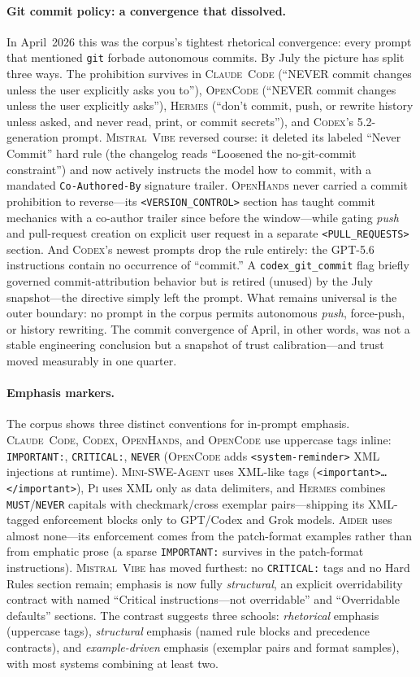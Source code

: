 \documentclass[11pt,a4paper]{article}
\newcommand{\clcode}{\textsc{Claude~Code}\xspace}
\newcommand{\cdx}{\textsc{Codex}\xspace}
\newcommand{\oh}{\textsc{OpenHands}\xspace}
\newcommand{\adr}{\textsc{Aider}\xspace}
\newcommand{\mswe}{\textsc{Mini-SWE-Agent}\xspace}
\newcommand{\vibe}{\textsc{Mistral~Vibe}\xspace}
\newcommand{\hrm}{\textsc{Hermes}\xspace}
\newcommand{\pib}{\textsc{Pi}\xspace}
\newcommand{\ocd}{\textsc{OpenCode}\xspace}
\begin{document}
\paragraph{Git commit policy: a convergence that dissolved.}
In April~2026 this was the corpus's tightest rhetorical convergence: every prompt that mentioned \texttt{git} forbade autonomous commits.
By July the picture has split three ways.
The prohibition survives in \clcode{} (``NEVER commit changes unless the user explicitly asks you to''), \ocd{} (``NEVER commit changes unless the user explicitly asks''), \hrm{} (``don't commit, push, or rewrite history unless asked, and never read, print, or commit secrets''), and \cdx{}'s 5.2-generation prompt.
\vibe{} reversed course: it deleted its labeled ``Never Commit'' hard rule (the changelog reads ``Loosened the no-git-commit constraint'') and now actively instructs the model how to commit, with a mandated \texttt{Co-Authored-By} signature trailer. \oh{} never carried a commit prohibition to reverse---its \texttt{<VERSION\_CONTROL>} section has taught commit mechanics with a co-author trailer since before the window---while gating \emph{push} and pull-request creation on explicit user request in a separate \texttt{<PULL\_REQUESTS>} section.
And \cdx{}'s newest prompts drop the rule entirely: the GPT-5.6 instructions contain no occurrence of ``commit.'' A \texttt{codex\_git\_commit} flag briefly governed commit-attribution behavior but is retired (unused) by the July snapshot---the directive simply left the prompt.
What remains universal is the outer boundary: no prompt in the corpus permits autonomous \emph{push}, force-push, or history rewriting.
The commit convergence of April, in other words, was not a stable engineering conclusion but a snapshot of trust calibration---and trust moved measurably in one quarter.

\paragraph{Emphasis markers.}
The corpus shows three distinct conventions for in-prompt emphasis.
\clcode{}, \cdx{}, \oh{}, and \ocd{} use uppercase tags inline: \texttt{IMPORTANT:}, \texttt{CRITICAL:}, \texttt{NEVER} (\ocd{} adds \texttt{<system-reminder>} XML injections at runtime).
\mswe{} uses XML-like tags (\texttt{<important>\dots</important>}), \pib{} uses XML only as data delimiters, and \hrm{} combines \texttt{MUST}/\texttt{NEVER} capitals with checkmark/cross exemplar pairs---shipping its XML-tagged enforcement blocks only to GPT/Codex and Grok models.
\adr{} uses almost none---its enforcement comes from the patch-format examples rather than from emphatic prose (a sparse \texttt{IMPORTANT:} survives in the patch-format instructions).
\vibe{} has moved furthest: no \texttt{CRITICAL:} tags and no Hard Rules section remain; emphasis is now fully \emph{structural}, an explicit overridability contract with named ``Critical instructions---not overridable'' and ``Overridable defaults'' sections.
The contrast suggests three schools: \emph{rhetorical} emphasis (uppercase tags), \emph{structural} emphasis (named rule blocks and precedence contracts), and \emph{example-driven} emphasis (exemplar pairs and format samples), with most systems combining at least two.
\end{document}
